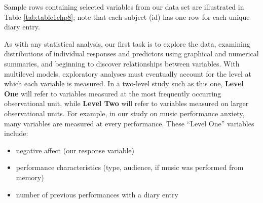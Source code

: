 \documentclass[
]{krantz}
\providecommand{\tightlist}{%
  \setlength{\itemsep}{0pt}\setlength{\parskip}{0pt}}
\begin{document}
Sample rows containing selected variables from our data set are illustrated in Table \ref{tab:table1chp8}; note that each subject (id) has one row for each unique diary entry.

\begin{table}

\caption{\label{tab:table1chp8}A snapshot of selected variables from the first three and the last three observations in the Music Performance Anxiety case study.}
\centering
{}
\end{table}

As with any statistical analysis, our first task is to explore the data, examining distributions of individual responses and predictors using graphical and numerical summaries, and beginning to discover relationships between variables. With multilevel models, exploratory analyses must eventually account for the level at which each variable is measured. In a two-level study such as this one, \textbf{Level One}  will refer to variables measured at the most frequently occurring observational unit, while \textbf{Level Two} will refer to variables measured on larger observational units. For example, in our study on music performance anxiety, many variables are measured at every performance. These ``Level One'' variables include:

\begin{itemize}
\tightlist
\item
  negative affect (our response variable)
\item
  performance characteristics (type, audience, if music was performed from memory)
\item
  number of previous performances with a diary entry
\end{itemize}
\end{document}
